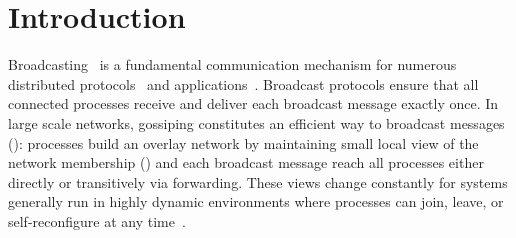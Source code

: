 
\section{Introduction}


Broadcasting~\cite{hadzilacos1994modular} is a fundamental communication
mechanism for numerous distributed
protocols~\cite{nakamoto2009bitcoin,shapiro2011comprehensive} and
applications~\cite{nedelec2016crate}.  Broadcast protocols ensure that all
connected processes receive and deliver each broadcast message exactly once. In
large scale networks, gossiping constitutes an efficient way to broadcast
messages (\REF): processes build an overlay network by maintaining small local
view of the network membership (\REF) and each broadcast message reach all
processes either directly or transitively via forwarding. These views change
constantly for systems generally run in highly dynamic environments where
processes can join, leave, or self-reconfigure at any
time~\cite{mostefaoui2005static}.

